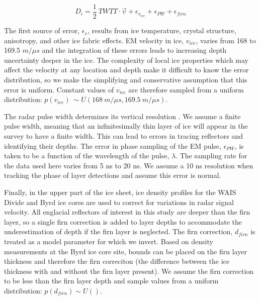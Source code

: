 \begin{equation}\label{deptheqn}
D_i = \frac{1}{2}~TWTT \cdot \vec{v} + \epsilon_{v_{ice}} + \epsilon_{PW} + \epsilon_{firn}
\end{equation}

The first source of error, $\epsilon_{v}$, results from ice temperature, crystal structure, anisotropy, and other ice fabric effects. EM velocity in ice, $v_{ice}$, varies from 168 to 169.5 $m/{\mu}s$ \citep{fujita2000} and the integration of these errors leads to increasing depth uncertainty deeper in the ice.  The complexity of local ice properties which may affect the velocity at any location and depth make it difficult to know the error distribution, so we make the simplifying and conservative assumption that this error is uniform. Constant values of $v_{ice}$ are therefore sampled from a uniform distribution: $p(v_{ice}) ~\sim U(168~m/{\mu}s,169.5~m/{\mu}s)$.

The radar pulse width determines its vertical resolution \citep{millar1982}. We assume a finite pulse width, meaning that an infinitesimally thin layer of ice will appear in the survey to have a finite width. This can lead to errors in tracing reflectors and identifying their depths. The error in phase sampling of the EM pulse, $\epsilon_{PW}$, is taken to be a function of the wavelength of the pulse, $\lambda$. The sampling rate for the data used here varies from 5 ns to 20 ns. We assume a 10 ns resolution when tracking the phase of layer detections and assume this error is normal.

Finally, in the upper part of the ice sheet, ice density profiles for the WAIS Divide \citep{kreutz2011} and Byrd \citep{gow1968} ice cores are used to correct for variations in radar signal velocity. All englacial reflectors of interest in this study are deeper than the firn layer, so a single firn correction is added to layer depths to accommodate the underestimation of depth if the firn layer is neglected. The firn correction, $d_{firn}$ is treated as a model parameter for which we invert. Based on density measurements at the Byrd ice core site, bounds can be placed on the firn layer thickness and therefore the firn correciton (the difference between the ice thickness with and without the firn layer present). We assume the firn correction to be less than the firn layer depth and sample values from a uniform distribution: $p(d_{firn}) \sim U()$. %

